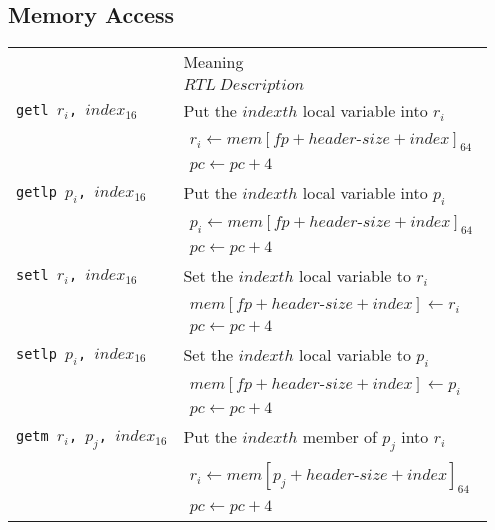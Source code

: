 		\subsection{Memory Access}
		\begin{longtable}{|p{10em}|p{30em}|}
			\hline \endfoot
			\hline 
			\multirow{2}{*}{Instruction} & Meaning \\*
			& $RTL~Description$ \\
			\hline \endhead
			\texttt{getl $r_i$, $index_{16}$} & Put the $indexth$ local variable into $r_i$ \\*
			& $\begin{array}{lcl}
			r_i \leftarrow mem[fp + header\mbox{-}size + index]_{64} \\
			pc \leftarrow pc + 4
			\end{array}$ \\
			\hline
			\texttt{getlp $p_i$, $index_{16}$} & Put the $indexth$ local variable into $p_i$ \\*
			& $\begin{array}{lcl}
			p_i \leftarrow mem[fp + header\mbox{-}size + index]_{64} \\
			pc \leftarrow pc + 4
			\end{array}$ \\
			\hline
			\texttt{setl $r_i$, $index_{16}$} & Set the $indexth$ local variable to $r_i$ \\*
			& $\begin{array}{lcl}
			 mem[fp + header\mbox{-}size + index] \leftarrow r_i \\
			pc \leftarrow pc + 4
			\end{array}$ \\
			\hline
			\texttt{setlp $p_i$, $index_{16}$} & Set the $indexth$ local variable to $p_i$ \\*
			& $\begin{array}{lcl}
			mem[fp + header\mbox{-}size + index] \leftarrow p_i \\
			pc \leftarrow pc + 4
			\end{array}$ \\
			\hline
			\texttt{getm $r_i$, $p_j$, $index_{16}$} & Put the $indexth$ member of $p_j$ into $r_i$ \\*
			& $\begin{array}{lcl}
			r_i \leftarrow mem[p_j + header\mbox{-}size + index]_{64} \\
			pc \leftarrow pc + 4
			\end{array}$ \\
			\hline

\end{longtable}
